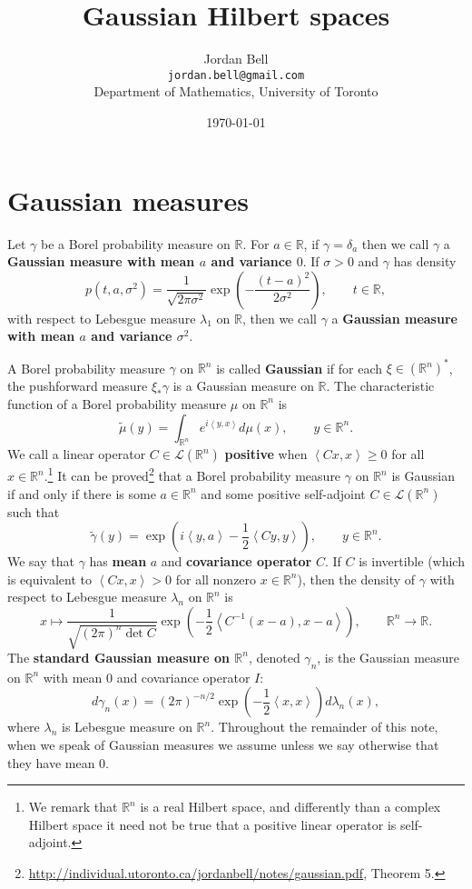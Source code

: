 \documentclass{article}
\newcommand{\inner}[2]{\left\langle #1, #2 \right\rangle}
\theoremstyle{definition}
\begin{document}
\title{Gaussian Hilbert spaces}
\author{Jordan Bell\\ \texttt{jordan.bell@gmail.com}\\Department of Mathematics, University of Toronto}
\date{\today}

\maketitle


\section{Gaussian measures}
Let $\gamma$ be a Borel probability measure on $\mathbb{R}$. For $a \in \mathbb{R}$, if 
$\gamma=\delta_a$ then we call $\gamma$ a \textbf{Gaussian measure with mean $a$ and variance $0$}.
If $\sigma>0$ and $\gamma$ has density
\[
p(t,a,\sigma^2) = \frac{1}{\sqrt{2\pi \sigma^2}} \exp\left(-\frac{(t-a)^2}{2\sigma^2}\right),\qquad t \in \mathbb{R},
\]
with respect to Lebesgue measure $\lambda_1$ on $\mathbb{R}$, then we call $\gamma$ a \textbf{Gaussian measure with 
mean $a$ and variance $\sigma^2$}.

A Borel probability measure $\gamma$ on $\mathbb{R}^n$ is called \textbf{Gaussian} if for each
$\xi \in (\mathbb{R}^n)^*$, the pushforward measure $\xi_* \gamma$ is a Gaussian measure on $\mathbb{R}$. 
The characteristic function of a Borel probability measure $\mu$ on $\mathbb{R}^n$ is
\[
\widetilde{\mu}(y) = \int_{\mathbb{R}^n} e^{i\inner{y}{x}} d\mu(x),\qquad y \in \mathbb{R}^n.
\]
We call a linear operator $C \in \mathscr{L}(\mathbb{R}^n)$ \textbf{positive} when $\inner{Cx}{x} \geq 0$ for all $x \in \mathbb{R}^n$.\footnote{We remark that
$\mathbb{R}^n$
is a real Hilbert space, and differently than a complex Hilbert space it need not be true that a positive linear operator
is self-adjoint.} It can be proved\footnote{\url{http://individual.utoronto.ca/jordanbell/notes/gaussian.pdf},
Theorem 5.} that a Borel probability measure $\gamma$ on $\mathbb{R}^n$ is Gaussian if and only
if there is some $a \in \mathbb{R}^n$ and some positive self-adjoint $C \in \mathscr{L}(\mathbb{R}^n)$ such that
\[
\widetilde{\gamma}(y) = \exp\left(i\inner{y}{a} - \frac{1}{2}\inner{Cy}{y} \right),\qquad y \in \mathbb{R}^n.
\]
We say that $\gamma$ has \textbf{mean} $a$ and \textbf{covariance operator}
$C$.
If $C$ is invertible (which is equivalent to $\inner{Cx}{x}>0$ for all nonzero $x \in \mathbb{R}^n$), then 
the density of $\gamma$ with respect to Lebesgue measure $\lambda_n$ on $\mathbb{R}^n$ is
\[
x \mapsto \frac{1}{\sqrt{(2\pi)^n \det C}} \exp\left(-\frac{1}{2}\inner{C^{-1}(x-a)}{x-a}\right), \qquad \mathbb{R}^n \to \mathbb{R}.
\]
The \textbf{standard Gaussian measure on $\mathbb{R}^n$}, denoted
$\gamma_n$,
is the Gaussian measure on $\mathbb{R}^n$ with mean $0$ and covariance operator $I$:
\[
d\gamma_n(x) =(2\pi)^{-n/2} \exp\left(-\frac{1}{2}\inner{x}{x}\right)d\lambda_n(x),
\]
where $\lambda_n$ is Lebesgue measure on $\mathbb{R}^n$. 
Throughout  the remainder of this note, when we speak of Gaussian measures we assume unless we say otherwise
that they have mean $0$.
\end{document}
